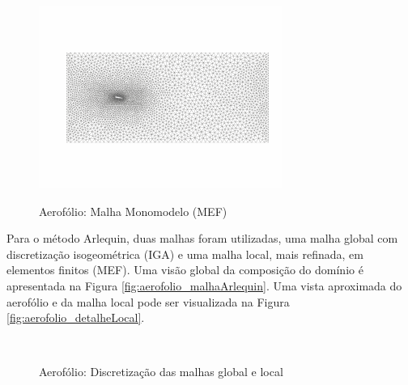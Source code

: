 \begin{figure}[!htbp]
	\caption{Aerofólio: Malha Monomodelo (MEF)}
	\centering 
	{\includegraphics[scale=2.5,trim=0cm 0.9cm 0cm 0.8cm, clip=true]{Imagens/Cap6/aerofolio_malhaMonoFEM.pdf}}	
	\label{fig:aerofolio_malhaMonoFEM}
\end{figure}

Para o método Arlequin, duas malhas foram utilizadas, uma malha global com discretização isogeométrica (IGA) e uma malha local, mais refinada, em elementos finitos (MEF). Uma visão global da composição do domínio é apresentada na Figura \ref{fig:aerofolio_malhaArlequin}. Uma vista aproximada do aerofólio e da malha local pode ser visualizada na Figura \ref{fig:aerofolio_detalheLocal}.

\begin{figure}[!htbp]
	\caption{Aerofólio: Discretização das malhas global e local}
	\centering
	\\
	\label{fig:aerofolio_malhaArlequin_detalheLocal}
\end{figure}


